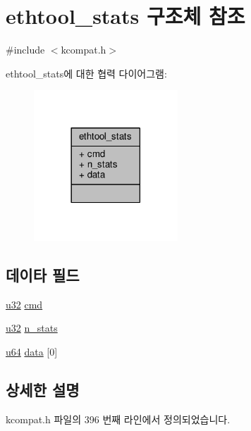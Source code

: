 \hypertarget{structethtool__stats}{}\section{ethtool\+\_\+stats 구조체 참조}
\label{structethtool__stats}


{\ttfamily \#include $<$kcompat.\+h$>$}



ethtool\+\_\+stats에 대한 협력 다이어그램\+:
\nopagebreak
\begin{figure}[H]
\begin{center}
\leavevmode
\includegraphics[width=153pt]{structethtool__stats__coll__graph}
\end{center}
\end{figure}
\subsection*{데이타 필드}
\begin{DoxyCompactItemize}
\item 
\hyperlink{lib_2igb_2e1000__osdep_8h_a64e91c10a0d8fb627e92932050284264}{u32} \hyperlink{structethtool__stats_a62fe2a1dbf17d5a8561a5a7f5a97a9ba}{cmd}
\item 
\hyperlink{lib_2igb_2e1000__osdep_8h_a64e91c10a0d8fb627e92932050284264}{u32} \hyperlink{structethtool__stats_a2b16bc73f229056a84b161491538fedd}{n\+\_\+stats}
\item 
\hyperlink{lib_2igb_2e1000__osdep_8h_a1d8f78f95a414480659f3182e6067b80}{u64} \hyperlink{structethtool__stats_ae94c28f3505a41fa45aad7ce037322f5}{data} \mbox{[}0\mbox{]}
\end{DoxyCompactItemize}


\subsection{상세한 설명}


kcompat.\+h 파일의 396 번째 라인에서 정의되었습니다.



